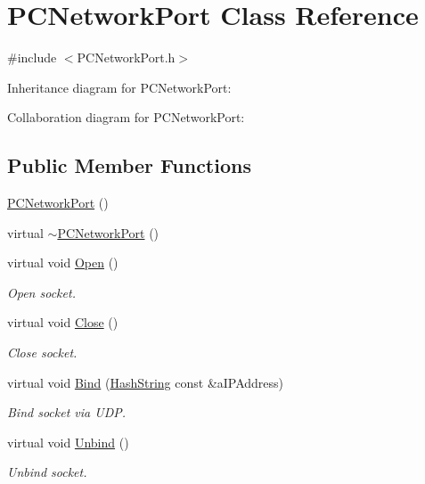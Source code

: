 \hypertarget{classPCNetworkPort}{}\section{P\+C\+Network\+Port Class Reference}
\label{classPCNetworkPort}


{\ttfamily \#include $<$P\+C\+Network\+Port.\+h$>$}



Inheritance diagram for P\+C\+Network\+Port\+:


Collaboration diagram for P\+C\+Network\+Port\+:
\subsection*{Public Member Functions}
\begin{DoxyCompactItemize}
\item 
\hyperlink{classPCNetworkPort_ae840e8e8a1cc5509f9ba3cb04217a9eb}{P\+C\+Network\+Port} ()
\item 
virtual \hyperlink{classPCNetworkPort_a189ff334a154a57e72c72d2263fe525a}{$\sim$\+P\+C\+Network\+Port} ()
\item 
virtual void \hyperlink{classPCNetworkPort_aa8e6ce9f58cd5e724d0c22c307de41fb}{Open} ()
\begin{DoxyCompactList}\small\item\em Open socket. \end{DoxyCompactList}\item 
virtual void \hyperlink{classPCNetworkPort_a40366f6ee2bceac82911bad11d276102}{Close} ()
\begin{DoxyCompactList}\small\item\em Close socket. \end{DoxyCompactList}\item 
virtual void \hyperlink{classPCNetworkPort_a03252967e3b101a36e45940b326c2d72}{Bind} (\hyperlink{classHashString}{Hash\+String} const \&a\+I\+P\+Address)
\begin{DoxyCompactList}\small\item\em Bind socket via U\+DP. \end{DoxyCompactList}\item 
virtual void \hyperlink{classPCNetworkPort_aa696d4f119110e976ac791931b1a187a}{Unbind} ()
\begin{DoxyCompactList}\small\item\em Unbind socket. \end{DoxyCompactList}\item 

\end{DoxyCompactItemize}
